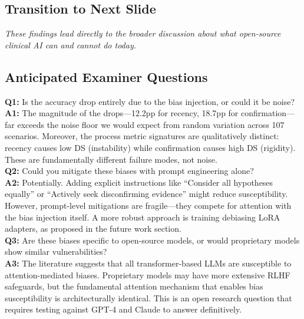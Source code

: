 \subsection*{Transition to Next Slide}
{\color{transgreen}
\textit{These findings lead directly to the broader discussion about what open-source clinical AI can and cannot do today.}
}

\subsection*{Anticipated Examiner Questions}
\begin{qabox}
\textbf{Q1:} Is the accuracy drop entirely due to the bias injection, or could it be noise? \\
\textbf{A1:} The magnitude of the drops---12.2pp for recency, 18.7pp for confirmation---far exceeds the noise floor we would expect from random variation across 107 scenarios. Moreover, the process metric signatures are qualitatively distinct: recency causes low DS (instability) while confirmation causes high DS (rigidity). These are fundamentally different failure modes, not noise. \\[6pt]
\textbf{Q2:} Could you mitigate these biases with prompt engineering alone? \\
\textbf{A2:} Potentially. Adding explicit instructions like ``Consider all hypotheses equally'' or ``Actively seek disconfirming evidence'' might reduce susceptibility. However, prompt-level mitigations are fragile---they compete for attention with the bias injection itself. A more robust approach is training debiasing LoRA adapters, as proposed in the future work section. \\[6pt]
\textbf{Q3:} Are these biases specific to open-source models, or would proprietary models show similar vulnerabilities? \\
\textbf{A3:} The literature suggests that all transformer-based LLMs are susceptible to attention-mediated biases. Proprietary models may have more extensive RLHF safeguards, but the fundamental attention mechanism that enables bias susceptibility is architecturally identical. This is an open research question that requires testing against GPT-4 and Claude to answer definitively.
\end{qabox}

